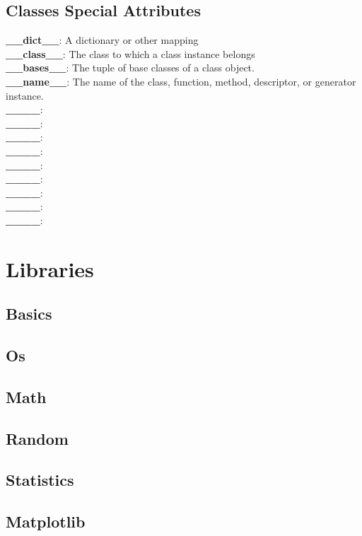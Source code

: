 \documentclass{cheatsheet}
\begin{document}
    \subsection{Classes Special Attributes}
    \textbf{\_\_dict\_\_}: A dictionary or other mapping \\
    \textbf{\_\_class\_\_}: The class to which a class instance belongs \\
    \textbf{\_\_bases\_\_}: The tuple of base classes of a class object.\\
    \textbf{\_\_name\_\_}: The name of the class, function, method, descriptor, or generator instance.\\
    \textbf{\_\_\_\_}: \\
    \textbf{\_\_\_\_}: \\
    \textbf{\_\_\_\_}: \\
    \textbf{\_\_\_\_}: \\
    \textbf{\_\_\_\_}: \\
    \textbf{\_\_\_\_}: \\
    \textbf{\_\_\_\_}: \\
    \textbf{\_\_\_\_}: \\
    \textbf{\_\_\_\_}: \\

\section{Libraries}
    \subsection{Basics}
    \subsection{Os}
    \subsection{Math}
    \subsection{Random}
    \subsection{Statistics}
    \subsection{Matplotlib}
\end{document}
